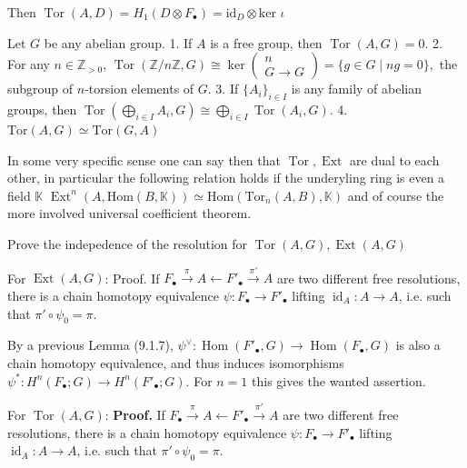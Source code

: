 Then \(  \operatorname{Tor}(A, D) = H_1(D \otimes F_\bullet) = \text{id}_D \otimes \text{ker }\iota \)

Let \(G\) be any abelian group.
1. If \(A\) is a free group, then \(\operatorname{Tor}(A, G) = 0\). 
2. For any \(n \in \mathbb{Z}_{>0}\), 
\(\operatorname{Tor}(\mathbb{Z}/n\mathbb{Z}, G) \cong \ker \left( \begin{array}{c} n \\ G \longrightarrow G \end{array} \right) = \{g \in G \mid ng = 0\},\)
the subgroup of \(n\)-torsion elements of \(G\).
3. If \(\{A_i\}_{i \in I}\) is any family of abelian groups, then 
\(\operatorname{Tor}\left( \bigoplus_{i \in I} A_i, G \right) \cong \bigoplus_{i \in I} \operatorname{Tor}(A_i, G). \)
4. \(\text{Tor}(A, G) \simeq \text{Tor}(G, A)\)

In some very specific sense one can say then that \( \operatorname{Tor},\operatorname{Ext} \) are dual to each other,
in particular the following relation holds if the underyling ring is even a field \( \mathbb{K} \)
\( \operatorname{Ext}^n(A, \text{Hom}(B, \mathbb{K})) \simeq \text{Hom}(\text{Tor}_n(A, B), \mathbb{K}) \)
and of course the more involved universal coefficient theorem.


Prove the indepedence of the resolution for \( \operatorname{Tor}(A, G), \operatorname{Ext}(A, G) \)


For \( \operatorname{Ext}(A, G) \):
Proof. 
If \( F_{\bullet} \xrightarrow{\pi} A \leftarrow F'_{\bullet} \xrightarrow{\pi'} A \) are two different free resolutions, 
there is a chain homotopy equivalence \(\psi: F_{\bullet} \rightarrow F'_{\bullet}\) lifting \(\operatorname{id}_A : A \rightarrow A \), 
i.e. such that \(\pi' \circ \psi_0 = \pi\). 

By a previous Lemma (9.1.7), 
\(\psi^{\vee} : \operatorname{Hom}(F'_{\bullet}, G) \rightarrow \operatorname{Hom}(F_{\bullet}, G) \) is also a chain homotopy equivalence, 
and thus induces isomorphisms \(\psi^{\ast}: H^n(F_{\bullet}; G) \rightarrow H^n(F'_{\bullet}; G)\). 
For \(n = 1\) this gives the wanted assertion.


For \( \operatorname{Tor}(A, G) \):
\textbf{Proof.} 
If \( F_{\bullet} \xrightarrow{\pi} A \leftarrow F'_{\bullet} \xrightarrow{\pi'} A \) are two different free resolutions, 
there is a chain homotopy equivalence \(\psi: F_{\bullet} \rightarrow F'_{\bullet}\) lifting \(\operatorname{id}_A : A \rightarrow A \), 
i.e. such that \(\pi' \circ \psi_0 = \pi\). 

